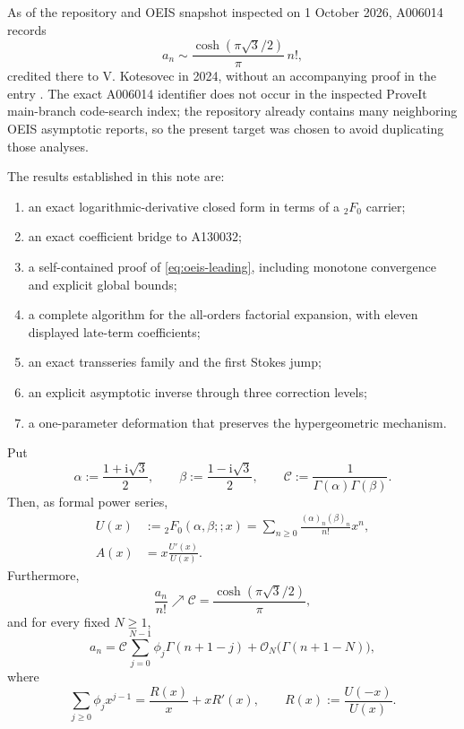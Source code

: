 \documentclass[11pt,a4paper]{article}
\theoremstyle{definition}
\theoremstyle{remark}
\newcommand{\ii}{\mathrm{i}}
\newcommand{\bigO}{\mathcal{O}}
\newcommand{\constC}{\mathcal{C}}
\begin{document}
As of the repository and OEIS snapshot inspected on 1 October 2026, A006014 records
\begin{equation}\label{eq:oeis-leading}
 a_n\sim \frac{\cosh(\pi\sqrt3/2)}{\pi}\,n!,
\end{equation}
credited there to V. Kotesovec in 2024, without an accompanying proof in the entry \cite{OEISA006014}.  The exact A006014 identifier does not occur in the inspected ProveIt main-branch code-search index; the repository already contains many neighboring OEIS asymptotic reports, so the present target was chosen to avoid duplicating those analyses.

The results established in this note are:
\begin{enumerate}
\item an exact logarithmic-derivative closed form in terms of a \({}_2F_0\) carrier;
\item an exact coefficient bridge to A130032;
\item a self-contained proof of \eqref{eq:oeis-leading}, including monotone convergence and explicit global bounds;
\item a complete algorithm for the all-orders factorial expansion, with eleven displayed late-term coefficients;
\item an exact transseries family and the first Stokes jump;
\item an explicit asymptotic inverse through three correction levels;
\item a one-parameter deformation that preserves the hypergeometric mechanism.
\end{enumerate}

\begin{resultbox}
Put
\begin{equation}\label{eq:alphabeta}
 \alpha:=\frac{1+\ii\sqrt3}{2},\qquad
 \beta:=\frac{1-\ii\sqrt3}{2},\qquad
 \constC:=\frac{1}{\Gamma(\alpha)\Gamma(\beta)}.
\end{equation}
Then, as formal power series,
\begin{align}
 U(x)&:={}_2F_0(\alpha,\beta;;x)
      =\sum_{n\ge0}\frac{(\alpha)_n(\beta)_n}{n!}x^n,\label{eq:Udef}\\
 A(x)&=x\frac{U'(x)}{U(x)}.\label{eq:AlogU}
\end{align}
Furthermore,
\begin{equation}\label{eq:mainlimit}
 \frac{a_n}{n!}\nearrow\constC
 =\frac{\cosh(\pi\sqrt3/2)}{\pi},
\end{equation}
and for every fixed \(N\ge1\),
\begin{equation}\label{eq:mainallorders}
 a_n=\constC\sum_{j=0}^{N-1}\phi_j\Gamma(n+1-j)
      +\bigO_N\!\bigl(\Gamma(n+1-N)\bigr),
\end{equation}
where
\begin{equation}\label{eq:Phigenerator-preview}
 \sum_{j\ge0}\phi_jx^{j-1}
 =\frac{R(x)}{x}+xR'(x),
 \qquad R(x):=\frac{U(-x)}{U(x)}.
\end{equation}
\end{resultbox}
\end{document}
